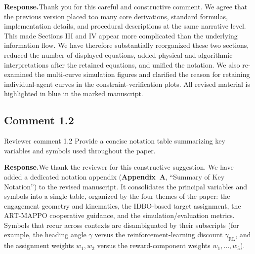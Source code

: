 \documentclass[11pt]{article}
\newcommand{\rsp}{\medskip\noindent\textbf{Response.}\quad}
\begin{document}
\rsp Thank you for this careful and constructive comment. We agree that the previous version placed
too many core derivations, standard formulas, implementation details, and procedural
descriptions at the same narrative level. This made Sections III and IV appear more complicated
than the underlying information flow. We have therefore substantially reorganized these two
sections, reduced the number of displayed equations, added physical and algorithmic
interpretations after the retained equations, and unified the notation. We also re-examined the
multi-curve simulation figures and clarified the reason for retaining individual-agent curves
in the constraint-verification plots. All revised material is highlighted in blue in the marked manuscript.


\subsection*{Comment 1.2}

\begin{reviewercomment}{Reviewer comment 1.2}
Provide a concise notation table summarizing key variables and symbols used
throughout the paper.
\end{reviewercomment}

\rsp We thank the reviewer for this constructive suggestion. We have added a
dedicated notation appendix (\textbf{Appendix~A}, ``Summary of Key Notation'') to
the revised manuscript. It consolidates the principal variables and symbols into a
single table, organized by the four themes of the paper: the engagement geometry
and kinematics, the IDBO-based target assignment, the ART-MAPPO cooperative
guidance, and the simulation/evaluation metrics. Symbols that recur across
contexts are disambiguated by their subscripts (for example, the heading angle
$\gamma$ versus the reinforcement-learning discount $\gamma_{\mathrm{RL}}$, and the
assignment weights $w_1,w_2$ versus the reward-component weights $w_1,\dots,w_5$).
\end{document}
